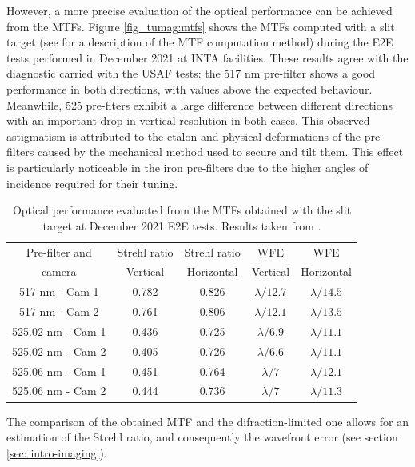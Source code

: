 However, a more precise evaluation of the optical performance can be achieved from the MTFs. Figure \ref{fig_tumag:mtfs} shows the MTFs computed with a slit target (see \cite{slanted-method} for a description of the MTF computation method) during the E2E tests performed in December 2021 at INTA facilities. These results agree with the diagnostic carried with the USAF tests: the 517 nm pre-filter shows a good performance in both directions, with values above the expected behaviour. Meanwhile, 525 pre-flters exhibit a large difference between different directions with an important drop in vertical resolution in both cases. This observed astigmatism is attributed to the etalon and physical deformations of the pre-filters caused by the mechanical method used to secure and tilt them. This effect is particularly noticeable in the iron pre-filters due to the higher angles of incidence required for their tuning.

\begin{table}[t]
    \centering
   \begin{tabular}{ccccc}
    \hline
    \hline
    Pre-filter and & Strehl ratio & Strehl ratio & WFE& WFE\\
    camera & Vertical & Horizontal & Vertical & Horizontal\\
    \hline
    517 nm - Cam 1 & 0.782 & 0.826 & $\lambda/12.7$ & $\lambda/14.5$ \\
    517 nm - Cam 2 & 0.761 & 0.806 & $\lambda/12.1$ & $\lambda/13.5$ \\
    525.02 nm - Cam 1 & 0.436 & 0.725 & $\lambda/6.9$ & $\lambda/11.1$ \\
    525.02 nm - Cam 2 & 0.405 & 0.726 & $\lambda/6.6$ & $\lambda/11.1$ \\
    525.06 nm - Cam 1 & 0.451 & 0.764 & $\lambda/7$ & $\lambda/12.1$ \\
    525.06 nm - Cam 2 & 0.444 & 0.736 & $\lambda/7$ & $\lambda/11.3$ \\
    \hline
    \hline
    \end{tabular}
    \caption{Optical performance evaluated from the MTFs obtained with the slit target at December 2021 E2E tests. Results taken from \citep{e2e-tests-inta}.}
    \label{table: Optical-performance}
\end{table}


The comparison of the obtained MTF and the difraction-limited one allows for an estimation of the Strehl ratio, and consequently the wavefront error (see section \ref{sec: intro-imaging}).

